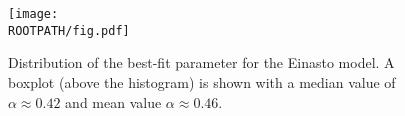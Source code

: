 \begin{figure}
	\centering%
	\texttt{[image: \\ROOTPATH/fig.pdf]}
	\caption{Distribution of the best-fit parameter for the Einasto model. A boxplot (above the histogram) is shown with a median value of $\alpha \approx 0.42$ and mean value $\alpha \approx 0.46$.}%
	\label{fig:parameter-distribution:einasto}%
\end{figure}